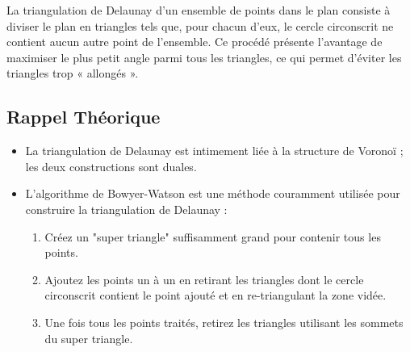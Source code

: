 \documentclass[a4paper,12pt]{article}
\theoremstyle{definition}
\begin{document}

\bigskip


La triangulation de Delaunay d'un ensemble de points dans le plan consiste à diviser le plan en triangles tels que, pour chacun d'eux, le cercle circonscrit ne contient aucun autre point de l'ensemble. Ce procédé présente l'avantage de maximiser le plus petit angle parmi tous les triangles, ce qui permet d'éviter les triangles trop « allongés ».

\subsection{Rappel Théorique}
\begin{itemize}
  \item La triangulation de Delaunay est intimement liée à la structure de Voronoï ; les deux constructions sont duales.
  \item L'algorithme de Bowyer-Watson est une méthode couramment utilisée pour construire la triangulation de Delaunay :
    \begin{enumerate}
      \item Créez un "super triangle" suffisamment grand pour contenir tous les points.
      \item Ajoutez les points un à un en retirant les triangles dont le cercle circonscrit contient le point ajouté et en re-triangulant la zone vidée.
      \item Une fois tous les points traités, retirez les triangles utilisant les sommets du super triangle.
    \end{enumerate}
\end{itemize}
\end{document}

